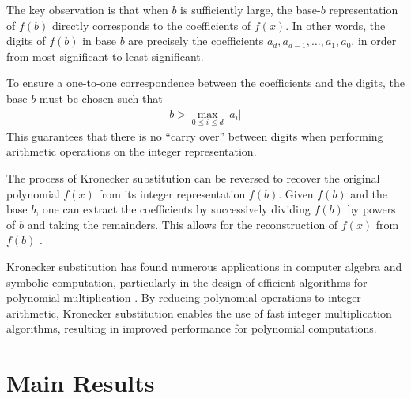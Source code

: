 \documentclass[12pt,reqno]{article}
\theoremstyle{plain}
\theoremstyle{definition}
\begin{document}
The key observation is that when $b$ is sufficiently large, the base-$b$ representation of $f(b)$ directly corresponds to the coefficients of $f(x)$. In other words, the digits of $f(b)$ in base $b$ are precisely the coefficients $a_d, a_{d-1}, \ldots, a_1, a_0$, in order from most significant to least significant.

To ensure a one-to-one correspondence between the coefficients and the digits, the base $b$ must be chosen such that
\begin{align*}
    b > \max_{0 \leq i \leq d} |a_i|
\end{align*}
This guarantees that there is no ``carry over'' between digits when performing arithmetic operations on the integer representation.

The process of Kronecker substitution can be reversed to recover the original polynomial $f(x)$ from its integer representation $f(b)$. Given $f(b)$ and the base $b$, one can extract the coefficients by successively dividing $f(b)$ by powers of $b$ and taking the remainders. This allows for the reconstruction of $f(x)$ from $f(b)$ \cite{grimaldi2004discrete}.

Kronecker substitution has found numerous applications in computer algebra and symbolic computation, particularly in the design of efficient algorithms for polynomial multiplication \cite{harvey2009kronecker, harvey2014faster}. By reducing polynomial operations to integer arithmetic, Kronecker substitution enables the use of fast integer multiplication algorithms, resulting in improved performance for polynomial computations.

\section{Main Results} \label{section:results}
\end{document}
